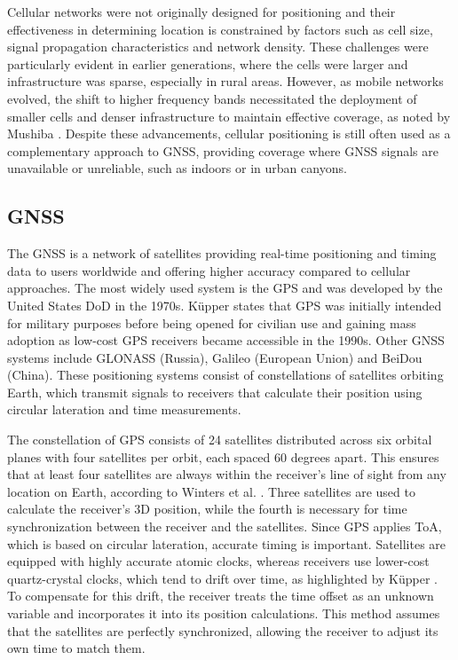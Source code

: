 Cellular networks were not originally designed for positioning and their effectiveness in determining location is constrained by factors such as cell size, signal propagation characteristics and network density. 
These challenges were particularly evident in earlier generations, where the cells were larger and infrastructure was sparse, especially in rural areas.
However, as mobile networks evolved, the shift to higher frequency bands necessitated the deployment of smaller cells and denser infrastructure to maintain effective coverage, as noted by Mushiba \cite{mushiba2024gsm}. 
Despite these advancements, cellular positioning is still often used as a complementary approach to \acs{GNSS}, providing coverage where \acs{GNSS} signals are unavailable or unreliable, such as indoors or in urban canyons.

\subsection{GNSS}
\label{sec:gnss}
The \acs{GNSS} is a network of satellites providing real-time positioning and timing data to users worldwide and offering higher accuracy compared to cellular approaches.
The most widely used system is the \ac{GPS} and was developed by the United States \ac{DoD} in the 1970s.
K\"upper \cite{kupper2005location} states that \acs{GPS} was initially intended for military purposes before being opened for civilian use and gaining mass adoption as low-cost GPS receivers became accessible in the 1990s.
Other GNSS systems include GLONASS (Russia), Galileo (European Union) and BeiDou (China). 
These positioning systems consist of constellations of satellites orbiting Earth, which transmit signals to receivers that calculate their position using circular lateration and time measurements.

The constellation of \acs{GPS} consists of 24 satellites distributed across six orbital planes with four satellites per orbit, each spaced 60 degrees apart. 
This ensures that at least four satellites are always within the receiver's line of sight from any location on Earth, according to Winters et al. \cite{winters2008travel}.  
Three satellites are used to calculate the receiver's 3D position, while the fourth is necessary for time synchronization between the receiver and the satellites. 
Since GPS applies \ac{ToA}, which is based on circular lateration, accurate timing is important. 
Satellites are equipped with highly accurate atomic clocks, whereas receivers use lower-cost quartz-crystal clocks, which tend to drift over time, as highlighted by K\"upper \cite{kupper2005location}. 
To compensate for this drift, the receiver treats the time offset as an unknown variable and incorporates it into its position calculations. 
This method assumes that the satellites are perfectly synchronized, allowing the receiver to adjust its own time to match them.  

